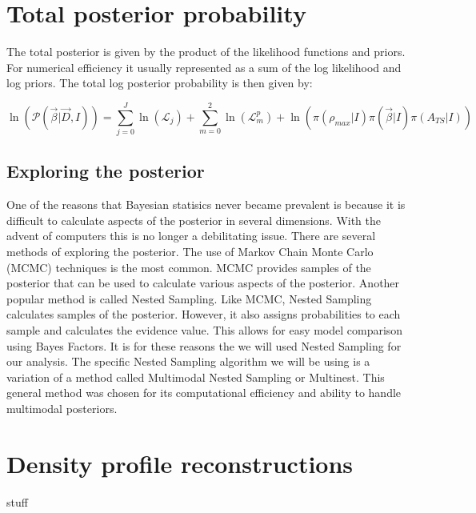 \documentclass[12pt]{article}
\numberwithin{equation}{section}
\begin{document}
\section{Total posterior probability}
The total posterior is given by the product of the likelihood functions and priors. For numerical efficiency it usually represented as a sum of the log likelihood and log priors. The total log posterior probability is then given by:

\begin{equation} \label{eq:tot_post} 
\ln(\mathcal{P}(\vec{\beta}|\vec{D},I)) = \sum \limits_{j=0}^{J} \ln(\mathcal{L}_j) + \sum \limits_{m=0}^{2} \ln(\mathcal{L}^p_m)  + \ln(\pi(\rho_{max}|I)\pi(\vec{\beta}|I)\pi(A_{TS}|I))
\end{equation}
\subsection{Exploring the posterior}
One of the reasons that Bayesian statisics never became prevalent is because it is difficult to calculate aspects of the posterior in several dimensions. With the advent of computers this is no longer a debilitating issue. There are several methods of exploring the posterior. The use of Markov Chain Monte Carlo (MCMC) techniques is the most common. MCMC provides samples of the posterior that can be used to calculate various aspects of the posterior. Another popular method is called Nested Sampling\cite{skilling2006nested}. Like MCMC, Nested Sampling calculates samples of the posterior. However, it also assigns probabilities to each sample and calculates the evidence value. This allows for easy model comparison using Bayes Factors. It is for these reasons the we will used Nested Sampling for our analysis. The specific Nested Sampling algorithm we will be using is a variation of a method called Multimodal Nested Sampling or Multinest\cite{feroz2008multimodal}\cite{feroz2009multinest}. This general method was chosen for its computational efficiency and ability to handle multimodal posteriors.

\section{Density profile reconstructions}
stuff
\end{document}
